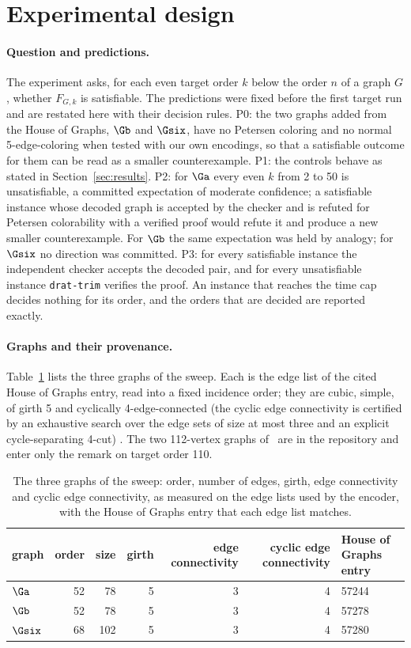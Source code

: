 \section{Experimental design}\label{sec:design}

\paragraph{Question and predictions.} The experiment asks, for each even target order $k$ below the order $n$ of a graph $G$, whether $F_{G,k}$ is satisfiable. The predictions were fixed before the first
target run and are restated here with their decision rules. P0: the two graphs added from the House of Graphs, $\Gb$ and $\Gsix$, have no Petersen coloring and no normal 5-edge-coloring when tested with our
own encodings, so that a satisfiable outcome for them can be read as a smaller counterexample. P1: the controls behave as stated in Section~\ref{sec:results}. P2: for $\Ga$ every even $k$ from 2 to 50 is unsatisfiable,
a committed expectation of moderate confidence; a satisfiable instance whose decoded graph is accepted by the checker and is refuted for Petersen colorability with a verified proof would refute it and produce a new
smaller counterexample. For $\Gb$ the same expectation was held by analogy; for $\Gsix$ no direction was committed. P3: for every satisfiable instance the independent checker accepts the decoded pair, and for every
unsatisfiable instance \texttt{drat-trim} verifies the proof. An instance that reaches the time cap decides nothing for its order, and the orders that are decided are reported exactly.

\paragraph{Graphs and their provenance.} Table~\ref{tab:graphs} lists the three graphs of the sweep. Each is the edge list of the cited House of Graphs entry, read into a fixed incidence order; they are cubic, simple, of girth 5 and
cyclically 4-edge-connected (the cyclic edge connectivity is certified by an exhaustive search over the edge sets of size at most three and an explicit cycle-separating 4-cut) \evMV{}. The two 112-vertex graphs of~\cite{Putman2026} are in the repository and enter only
the remark on target order 110.

\begin{table}[t]\centering\small
\begin{tabular}{lrrrrrl}
\toprule
graph & order & size & girth & edge connectivity & cyclic edge connectivity & House of Graphs entry \\
\midrule
$\Ga$ & 52 & 78 & 5 & 3 & 4 & 57244 \\
$\Gb$ & 52 & 78 & 5 & 3 & 4 & 57278 \\
$\Gsix$ & 68 & 102 & 5 & 3 & 4 & 57280 \\
\bottomrule
\end{tabular}
\caption{The three graphs of the sweep: order, number of edges, girth, edge connectivity and cyclic edge connectivity, as measured on the edge lists used by the encoder, with the House of Graphs entry that each edge list matches.}\label{tab:graphs}
\end{table}

